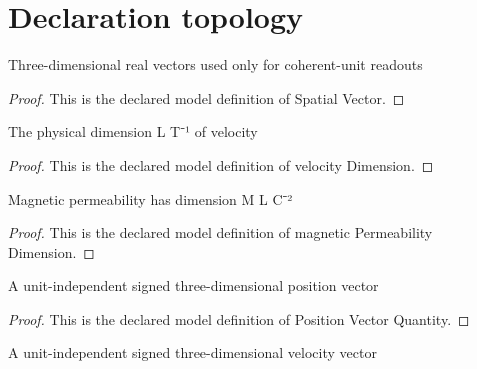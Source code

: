 \section{Declaration topology}
\begin{definition}
  \label{def:physics:phyx-mini-0959:phyxminiproblems-problemphyxmini0959-spatialvector}
  Three-dimensional real vectors used only for coherent-unit readouts
\end{definition}
\begin{proof}
  This is the declared model definition of Spatial Vector.
\end{proof}
\begin{definition}
  \label{def:physics:phyx-mini-0959:phyxminiproblems-problemphyxmini0959-velocitydimension}
  The physical dimension L T⁻¹ of velocity
\end{definition}
\begin{proof}
  This is the declared model definition of velocity Dimension.
\end{proof}
\begin{definition}
  \label{def:physics:phyx-mini-0959:phyxminiproblems-problemphyxmini0959-magneticpermeabilitydimension}
  Magnetic permeability has dimension M L C⁻²
\end{definition}
\begin{proof}
  This is the declared model definition of magnetic Permeability Dimension.
\end{proof}
\begin{definition}
  \label{def:physics:phyx-mini-0959:phyxminiproblems-problemphyxmini0959-positionvectorquantity}
  A unit-independent signed three-dimensional position vector
\end{definition}
\begin{proof}
  This is the declared model definition of Position Vector Quantity.
\end{proof}
\begin{definition}
  \label{def:physics:phyx-mini-0959:phyxminiproblems-problemphyxmini0959-velocityvectorquantity}
  A unit-independent signed three-dimensional velocity vector
\end{definition}
